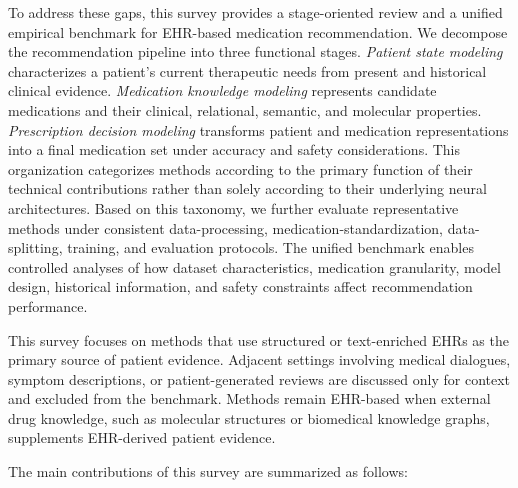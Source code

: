 \documentclass[manuscript,review]{acmart}
\begin{document}
To address these gaps, this survey provides a stage-oriented review and a unified empirical benchmark for EHR-based medication recommendation. We decompose the recommendation pipeline into three functional stages. \emph{Patient state modeling} characterizes a patient's current therapeutic needs from present and historical clinical evidence. \emph{Medication knowledge modeling} represents candidate medications and their clinical, relational, semantic, and molecular properties. \emph{Prescription decision modeling} transforms patient and medication representations into a final medication set under accuracy and safety considerations. This organization categorizes methods according to the primary function of their technical contributions rather than solely according to their underlying neural architectures. Based on this taxonomy, we further evaluate representative methods under consistent data-processing, medication-standardization, data-splitting, training, and evaluation protocols. The unified benchmark enables controlled analyses of how dataset characteristics, medication granularity, model design, historical information, and safety constraints affect recommendation performance.

This survey focuses on methods that use structured or text-enriched EHRs as the primary source of patient evidence. Adjacent settings involving medical dialogues, symptom descriptions,  or patient-generated reviews are discussed only for context and excluded from the benchmark. Methods remain EHR-based when external drug knowledge, such as molecular structures or biomedical knowledge graphs, supplements EHR-derived patient evidence.

The main contributions of this survey are summarized as follows:
\end{document}
